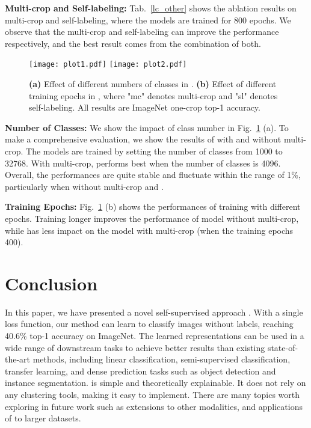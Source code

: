 \documentclass[10pt,twocolumn,letterpaper]{article}
\begin{document}
\textbf{Multi-crop and Self-labeling:} Tab.~\ref{lc_other} shows the ablation results on multi-crop and self-labeling, where the models are trained for 800 epochs. We observe that the multi-crop and self-labeling can improve the performance respectively, and the best result comes from the combination of both.

\begin{figure}[h]
        \vspace{-0.1cm}
        \begin{center}
        \texttt{[image: plot1.pdf]}
        \texttt{[image: plot2.pdf]}
        \end{center}
        \vspace{-0.4cm}
        \caption{\textbf{(a)} Effect of different numbers of classes in \ourmethod. \textbf{(b)} Effect of different training epochs in \ourmethod, where "mc" denotes multi-crop and "sl" denotes self-labeling. All results are ImageNet one-crop top-1 accuracy.}
        \vspace{-0.6cm}
\label{cls_epochs}
\end{figure}

\textbf{Number of Classes:} We show the impact of class number  in Fig.~\ref{cls_epochs} (a). To make a comprehensive evaluation, we show the results of \ourmethod with and without multi-crop. The models are trained by setting the number of classes from 1000 to 32768. With multi-crop, \ourmethod performs best when the number of classes is 4096. Overall, the performances are quite stable and fluctuate within the range of 1\%, particularly when without multi-crop and . 

\textbf{Training Epochs:} Fig.~\ref{cls_epochs} (b) shows the performances of training \ourmethod with different epochs. Training longer improves the performance of \ourmethod model without multi-crop, while has less impact on the \ourmethod model with multi-crop (when the training epochs  400).

\section{Conclusion}

In this paper, we have presented a novel self-supervised approach \ourmethod. With a single loss function, our method can learn to classify images without labels, reaching 40.6\% top-1 accuracy on ImageNet. The learned representations can be used in a wide range of downstream tasks to achieve better results than existing state-of-the-art methods, including linear classification, semi-supervised classification, transfer learning, and dense prediction tasks such as object detection and instance segmentation. \ourmethod is simple and theoretically explainable. It does not rely on any clustering tools, making it easy to implement. There are many topics worth exploring in future work such as extensions to other modalities, and applications of \ourmethod to larger datasets.
\end{document}
